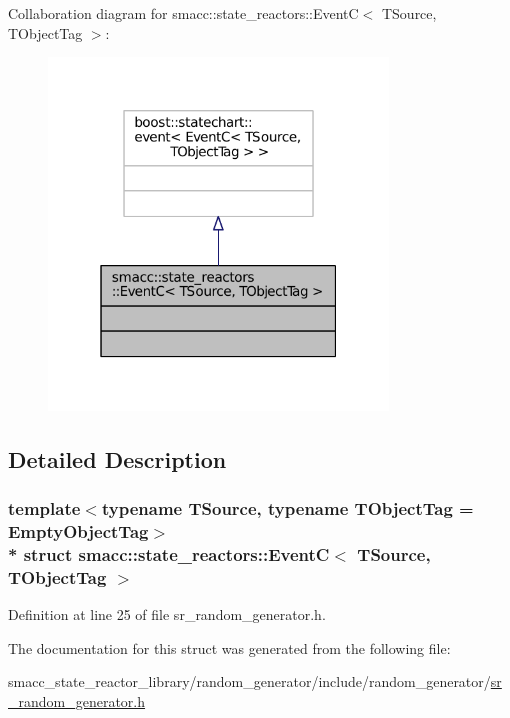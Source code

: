 Collaboration diagram for smacc\+:\+:state\+\_\+reactors\+:\+:EventC$<$ T\+Source, T\+Object\+Tag $>$\+:
\nopagebreak
\begin{figure}[H]
\begin{center}
\leavevmode
\includegraphics[width=256pt]{structsmacc_1_1state__reactors_1_1EventC__coll__graph}
\end{center}
\end{figure}


\subsection{Detailed Description}
\subsubsection*{template$<$typename T\+Source, typename T\+Object\+Tag = Empty\+Object\+Tag$>$\\*
struct smacc\+::state\+\_\+reactors\+::\+Event\+C$<$ T\+Source, T\+Object\+Tag $>$}



Definition at line 25 of file sr\+\_\+random\+\_\+generator.\+h.



The documentation for this struct was generated from the following file\+:\begin{DoxyCompactItemize}
\item 
smacc\+\_\+state\+\_\+reactor\+\_\+library/random\+\_\+generator/include/random\+\_\+generator/\hyperlink{sr__random__generator_8h}{sr\+\_\+random\+\_\+generator.\+h}\end{DoxyCompactItemize}

